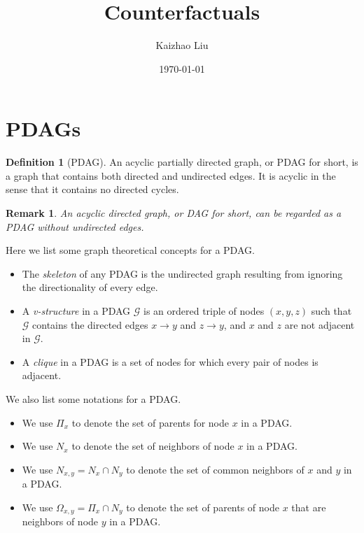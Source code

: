 \documentclass{article}
\title{Counterfactuals}
\author{Kaizhao Liu}
\date{\today}
\newtheorem*{remark}{Remark}
\theoremstyle{definition}
\newtheorem{definition}{Definition}[section]
\newcommand{\cG}{\mathcal{G}}
\newcommand{\<}{\left\langle}
\renewcommand{\>}{\right\rangle}
\begin{document}
\maketitle
\tableofcontents


\section{PDAGs}

\begin{definition}[PDAG]
    An acyclic partially directed graph, or PDAG for short, is a graph that contains both directed and undirected edges. It is acyclic in the sense that it contains no directed cycles.
\end{definition}
\begin{remark}
    An acyclic directed graph, or DAG for short, can be regarded as a PDAG without undirected edges.
\end{remark}
Here we list some graph theoretical concepts for a PDAG.
\begin{itemize}
    \item The \textit{skeleton} of any PDAG is the undirected graph resulting from ignoring the directionality of every edge. 
    \item A \textit{v-structure} in a PDAG $\cG$ is an ordered triple of nodes $(x,y,z)$ such that $\cG$ contains the directed edges $x \rightarrow y$ and $z \rightarrow y$, and $x$ and $z$ are not adjacent in $\cG$.
    \item A \textit{clique} in a PDAG is a set of nodes for which every pair of nodes is adjacent.
\end{itemize}
We also list some notations for a PDAG.
\begin{itemize}
    \item We use $\Pi_x$ to denote the set of parents for node $x$ in a PDAG.
    \item We use $N_x$ to denote the set of neighbors of node $x$ in a PDAG.
    \item We use $N_{x,y} = N_x \cap N_y$ to denote the set of common neighbors of $x$ and $y$ in a PDAG.
    \item We use $\Omega_{x,y} = \Pi_x \cap N_y$ to denote the set of parents of node $x$ that are neighbors of node $y$ in a PDAG.
\end{itemize}
\end{document}
